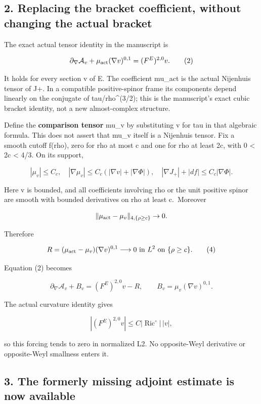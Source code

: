 \hypertarget{o10prolong:replacing-the-bracket-coefficient-without-changing-the-actual-bracket}{%
\subsection{2. Replacing the bracket coefficient, without changing the
actual
bracket}\label{o10prolong:replacing-the-bracket-coefficient-without-changing-the-actual-bracket}}

The exact actual tensor identity in the manuscript is

\[
 \partial_\nabla\mathcal A_v+
 \mu_{\rm act}(\nabla v)^{0,1}
 =(F^E)^{2,0}v.
\tag{2}
\]

It holds for every section v of E. The coefficient mu\_act is the actual
Nijenhuis tensor of J+. In a compatible positive-spinor frame its
components depend linearly on the conjugate of tau/rho\^{}(3/2); this is
the manuscript's exact cubic bracket identity, not a new almost-complex
structure.

Define the \textbf{comparison tensor} mu\_v by substituting v for tau in
that algebraic formula. This does not assert that mu\_v itself is a
Nijenhuis tensor. Fix a smooth cutoff f(rho), zero for rho at most c and
one for rho at least 2c, with 0 \textless{} 2c \textless{} 4/3. On its
support,

\[
 |\mu_v|\le C_c,
 \quad |\nabla\mu_v|\le C_c(|\nabla v|+|\nabla\Phi|),
 \quad |\nabla J_+|+|df|\le C_c|\nabla\Phi|.
\tag{3}
\]

Here v is bounded, and all coefficients involving rho or the unit
positive spinor are smooth with bounded derivatives on rho at least
c.~Moreover

\[
 \|\mu_{\rm act}-\mu_v\|_{4,\{\rho\ge c\}}\to0.
\]

Therefore

\[
 R=(\mu_{\rm act}-\mu_v)(\nabla v)^{0,1}
 \longrightarrow0\text{ in }L^2\text{ on }\{\rho\ge c\}.
\tag{4}
\]

Equation (2) becomes

\[
 \partial_\nabla\mathcal A_v+ B_v=(F^E)^{2,0}v-R,
 \qquad B_v=\mu_v(\nabla v)^{0,1}.
\tag{5}
\]

The actual curvature identity gives

\[
 |(F^E)^{2,0}v|\le C|\operatorname{Ric}^{\circ}|\,|v|,
\]

so this forcing tends to zero in normalized L2. No opposite-Weyl
derivative or opposite-Weyl smallness enters it.

\hypertarget{o10prolong:the-formerly-missing-adjoint-estimate-is-now-available}{%
\subsection{3. The formerly missing adjoint estimate is now
available}\label{o10prolong:the-formerly-missing-adjoint-estimate-is-now-available}}

